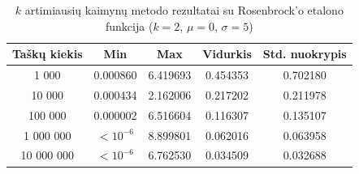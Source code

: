 \begin{table}[H]
    \centering
    \begin{tabular}{|c|c|c|c|c|}
        \hline
        \textbf{Taškų kiekis} & \textbf{Min} & \textbf{Max} & \textbf{Vidurkis} & \textbf{Std. nuokrypis} \\ \hline
        1 000        & 0.000860 & 6.419693 & 0.454353 & 0.702180 \\ \hline
        10 000       & 0.000434 & 2.162006 & 0.217202 & 0.211978 \\ \hline
        100 000      & 0.000002 & 6.516604 & 0.116307 & 0.135107 \\ \hline
        1 000 000    & $<10^{-6}$ & 8.899801 & 0.062016 & 0.063958 \\ \hline
        10 000 000   & $<10^{-6}$ & 6.762530 & 0.034509 & 0.032688 \\ \hline
    \end{tabular}
    \caption{$k$ artimiausių kaimynų metodo rezultatai su Rosenbrock'o etalono funkcija ($k = 2$, $\mu = 0$, $\sigma = 5$)}
\end{table}